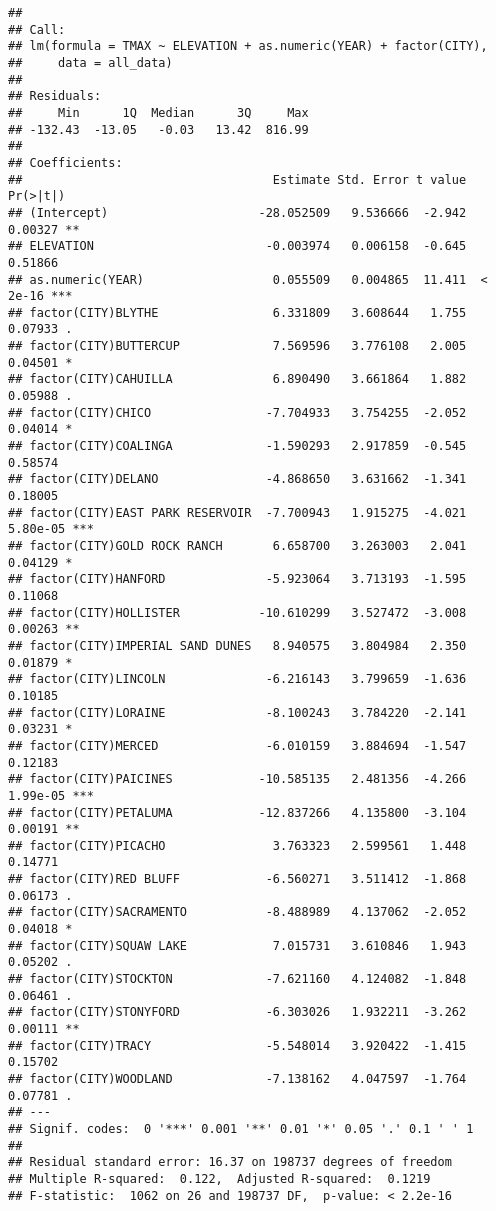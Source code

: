 \documentclass[]{article}
\begin{document}
\begin{verbatim}
## 
## Call:
## lm(formula = TMAX ~ ELEVATION + as.numeric(YEAR) + factor(CITY), 
##     data = all_data)
## 
## Residuals:
##     Min      1Q  Median      3Q     Max 
## -132.43  -13.05   -0.03   13.42  816.99 
## 
## Coefficients:
##                                   Estimate Std. Error t value Pr(>|t|)    
## (Intercept)                     -28.052509   9.536666  -2.942  0.00327 ** 
## ELEVATION                        -0.003974   0.006158  -0.645  0.51866    
## as.numeric(YEAR)                  0.055509   0.004865  11.411  < 2e-16 ***
## factor(CITY)BLYTHE                6.331809   3.608644   1.755  0.07933 .  
## factor(CITY)BUTTERCUP             7.569596   3.776108   2.005  0.04501 *  
## factor(CITY)CAHUILLA              6.890490   3.661864   1.882  0.05988 .  
## factor(CITY)CHICO                -7.704933   3.754255  -2.052  0.04014 *  
## factor(CITY)COALINGA             -1.590293   2.917859  -0.545  0.58574    
## factor(CITY)DELANO               -4.868650   3.631662  -1.341  0.18005    
## factor(CITY)EAST PARK RESERVOIR  -7.700943   1.915275  -4.021 5.80e-05 ***
## factor(CITY)GOLD ROCK RANCH       6.658700   3.263003   2.041  0.04129 *  
## factor(CITY)HANFORD              -5.923064   3.713193  -1.595  0.11068    
## factor(CITY)HOLLISTER           -10.610299   3.527472  -3.008  0.00263 ** 
## factor(CITY)IMPERIAL SAND DUNES   8.940575   3.804984   2.350  0.01879 *  
## factor(CITY)LINCOLN              -6.216143   3.799659  -1.636  0.10185    
## factor(CITY)LORAINE              -8.100243   3.784220  -2.141  0.03231 *  
## factor(CITY)MERCED               -6.010159   3.884694  -1.547  0.12183    
## factor(CITY)PAICINES            -10.585135   2.481356  -4.266 1.99e-05 ***
## factor(CITY)PETALUMA            -12.837266   4.135800  -3.104  0.00191 ** 
## factor(CITY)PICACHO               3.763323   2.599561   1.448  0.14771    
## factor(CITY)RED BLUFF            -6.560271   3.511412  -1.868  0.06173 .  
## factor(CITY)SACRAMENTO           -8.488989   4.137062  -2.052  0.04018 *  
## factor(CITY)SQUAW LAKE            7.015731   3.610846   1.943  0.05202 .  
## factor(CITY)STOCKTON             -7.621160   4.124082  -1.848  0.06461 .  
## factor(CITY)STONYFORD            -6.303026   1.932211  -3.262  0.00111 ** 
## factor(CITY)TRACY                -5.548014   3.920422  -1.415  0.15702    
## factor(CITY)WOODLAND             -7.138162   4.047597  -1.764  0.07781 .  
## ---
## Signif. codes:  0 '***' 0.001 '**' 0.01 '*' 0.05 '.' 0.1 ' ' 1
## 
## Residual standard error: 16.37 on 198737 degrees of freedom
## Multiple R-squared:  0.122,  Adjusted R-squared:  0.1219 
## F-statistic:  1062 on 26 and 198737 DF,  p-value: < 2.2e-16
\end{verbatim}
\end{document}
